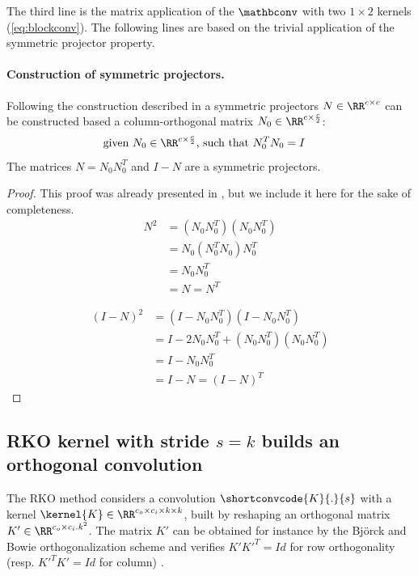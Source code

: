         The third line is the matrix application of the $\mathbconv$  with two $1\times 2$ kernels (\cref{eq:blockconv}). The following lines are based on the trivial application of the symmetric projector property.

        \paragraph{Construction of symmetric projectors.}  Following the construction described in \cite{li_preventing_2019} a symmetric projectors $N \in \RR^{c\times c}$ can be constructed based a column-orthogonal matrix $N_0 \in \RR^{c\times \frac{c}{2}}$:
        \begin{align*}
            \text{given }& N_0 \in \RR^{c\times \frac{c}{2}} \text{, such that }  N_0^T N_0 = I 
        \end{align*}
        The matrices $N = N_0 N_0^T$ and $I-N$ are a symmetric projectors.

    \begin{proof}
        This proof was already presented in \cite{li_preventing_2019}, but we include it here for the sake of completeness.
        \begin{align*}
        N^2 &=(N_0 N_0^T)(N_0 N_0^T) \\
        &= N_0(N_0^TN_0)N_0^T \\
        &= N_0N_0^T\\
        &=N=N^T
        \end{align*}
        
        \begin{align*}
        (I-N)^2 &=(I-N_0 N_0^T)(I-N_0 N_0^T) \\
        &= I -2N_0N_0^T + (N_0N_0^T)(N_0N_0^T) \\
        &= I-N_0N_0^T\\
        &=I-N=(I-N)^T
        \end{align*}
    \end{proof}

    \subsection{RKO kernel with stride \texorpdfstring{$s=k$}{s=k} builds an orthogonal convolution}\label{sec:ap_proof_rko}
    The RKO method considers a convolution $\shortconvcode{K}{.}{s}$ with a kernel $\kernel{K}\in\RR^{c_o\times c_i\times k\times k}$, built by reshaping an orthogonal matrix $K'\in\RR^{c_o\times c_i.k^2}$. The matrix $K'$ can be obtained for instance by  the Björck and Bowie orthogonalization scheme \cite{bjorck1971iterative} and verifies $K'K'^T=Id$ for row orthogonality (resp. $K'^TK'=Id$ for column) .
    
